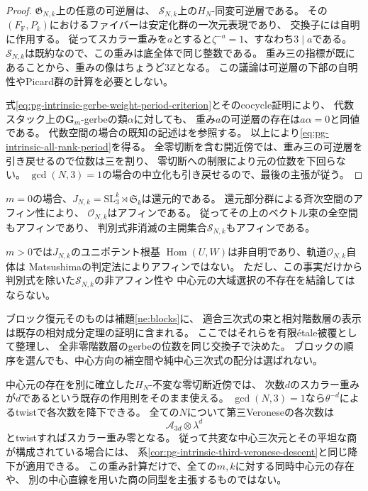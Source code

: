 \begin{proof}
$\mathfrak G_{N,k}$上の任意の可逆層は、
$\mathcal S_{N,k}$上の$H_N$-同変可逆層である。
その$(F_{\mathrm F},P_k)$におけるファイバーは安定化群の一次元表現であり、
交換子には自明に作用する。
従ってスカラー重みを$a$とすると$\zeta^{-a}=1$、すなわち$3\mid a$である。
$\mathcal S_{N,k}$は既約なので、この重みは底全体で同じ整数である。
重み三の指標が既にあることから、重みの像はちょうど$3\mathbb Z$となる。
この議論は可逆層の下部の自明性やPicard群の計算を必要としない。

式\eqref{eq:pg-intrinsic-gerbe-weight-period-criterion}とそのcocycle証明により、
代数スタック上の$\mathbf G_m$-gerbeの類$\alpha$に対しても、
重み$a$の可逆層の存在は$a\alpha=0$と同値である。
代数空間の場合の既知の記述は\cite[Lemma~3.1.1.8]{PLieblichPeriodIndex}を参照する。
以上により\eqref{eq:pg-intrinsic-all-rank-period}を得る。
全零切断を含む開近傍では、重み三の可逆層を引き戻せるので位数は三を割り、
零切断への制限により元の位数を下回らない。
$\gcd(N,3)=1$の場合の中立化も引き戻せるので、最後の主張が従う。
\end{proof}

\begin{remark}[満supportの場合のアフィン性]
\label{rem:pg-intrinsic-full-support-affinity}
$m=0$の場合、$J_{N,k}=\mathrm{SL}_3^k\rtimes\mathfrak S_k$は還元的である。
還元部分群による斉次空間のアフィン性\cite[Proposition~2.2, p.~2]{PArzhantsevMatsushima}により、
$\mathcal O_{N,k}$はアフィンである。
従ってその上のベクトル束の全空間もアフィンであり、
判別式非消滅の主開集合$\mathcal S_{N,k}$もアフィンである。

$m>0$では$J_{N,k}$のユニポテント根基
$\operatorname{Hom}(U,W)$は非自明であり、軌道$\mathcal O_{N,k}$自体は
Matsushimaの判定法\cite[Theorem~2.1, p.~2]{PArzhantsevMatsushima}によりアフィンではない。
ただし、この事実だけから判別式を除いた$\mathcal S_{N,k}$の非アフィン性や
中心元の大域選択の不存在を結論してはならない。
\end{remark}

\begin{remark}[既存結果との境界と中心元の降下]
\label{rem:pg-intrinsic-all-rank-descent-scope}
ブロック復元そのものは補題\ref{ne:blocks}に、
適合三次式の束と相対階数層の表示は既存の相対成分定理の証明に含まれる。
ここではそれらを有限\'etale被覆として整理し、
全非零階数層のgerbeの位数を同じ交換子で決めた。
ブロックの順序を選んでも、中心方向の補空間や純中心三次式の配分は選ばれない。

中心元の存在を別に確立した$H_N$-不変な零切断近傍では、
次数$d$のスカラー重みが$d$であるという既存の作用則をそのまま使える。
$\gcd(N,3)=1$なら$\theta^{-d}$によるtwistで各次数を降下できる。
全ての$N$について第三Veroneseの各次数は
\begin{equation}
 \mathcal A_{3d}\otimes\lambda^d
 \label{eq:pg-intrinsic-all-rank-third-veronese-weight}
\end{equation}
とtwistすればスカラー重み零となる。
従って共変な中心三次元とその平坦な商が構成されている場合には、
系\ref{cor:pg-intrinsic-third-veronese-descent}と同じ降下が適用できる。
この重み計算だけで、全ての$m,k$に対する同時中心元の存在や、
別の中心直線を用いた商の同型を主張するものではない。
\end{remark}

